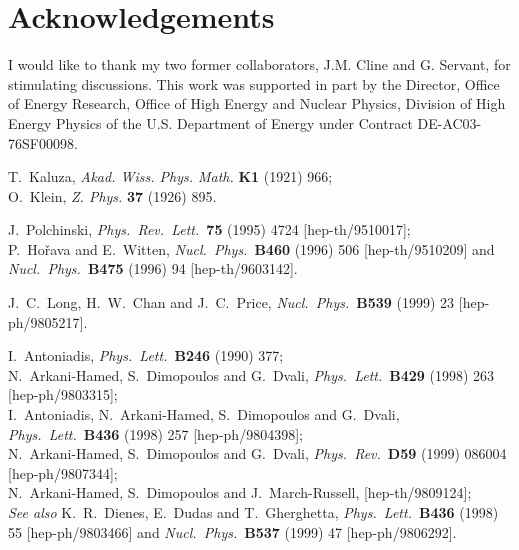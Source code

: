 \documentclass[a4paper,12pt]{article}
\begin{document}
\section*{Acknowledgements}

I would like to thank my two former collaborators, J.M. Cline
and G. Servant, for stimulating discussions.
This work was supported in part by the Director, Office
of Energy Research, Office of High Energy and Nuclear Physics, Division of
High Energy Physics of the U.S. Department of Energy under Contract
DE-AC03-76SF00098.


\begin{thebibliography}{99}

\small

T.~Kaluza, {\it Akad. Wiss. Phys. Math.} {\bf K1} (1921) 966;\\
O.~Klein, {\it Z. Phys.} {\bf 37} (1926) 895.

J.~Polchinski,
{\it Phys.\ Rev.\ Lett.}\  {\bf 75} (1995) 4724
[hep-th/9510017];\\
P.~Ho{\v r}ava and E.~Witten,
{\it Nucl.\ Phys.}\  {\bf B460} (1996) 506
[hep-th/9510209] and
{\it Nucl.\ Phys.}\  {\bf B475} (1996) 94
[hep-th/9603142].

J.~C.~Long, H.~W.~Chan and J.~C.~Price,
{\it Nucl.\ Phys.}\  {\bf B539} (1999) 23
[hep-ph/9805217].


I.~Antoniadis,
{\it Phys.\ Lett.}\ {\bf B246} (1990) 377;\\
%
N.~Arkani-Hamed, S.~Dimopoulos and G.~Dvali,
{\it Phys.\ Lett.}\  {\bf B429} (1998) 263
[hep-ph/9803315];\\
I.~Antoniadis, N.~Arkani-Hamed, S.~Dimopoulos and G.~Dvali,
{\it Phys.\ Lett.}\ {\bf B436} (1998) 257
[hep-ph/9804398];\\
%
N.~Arkani-Hamed, S.~Dimopoulos and G.~Dvali,
{\it Phys.\ Rev.}\  {\bf D59} (1999) 086004
[hep-ph/9807344];\\
%
N.~Arkani-Hamed, S.~Dimopoulos and J.~March-Russell,
[hep-th/9809124];\\
%
{\it See also}
K.~R.~Dienes, E.~Dudas and T.~Gherghetta,
{\it Phys.\ Lett.}\  {\bf B436} (1998) 55
[hep-ph/9803466]
%
and
{\it Nucl.\ Phys.}\  {\bf B537} (1999) 47
[hep-ph/9806292].


\end{thebibliography}
\end{document}
